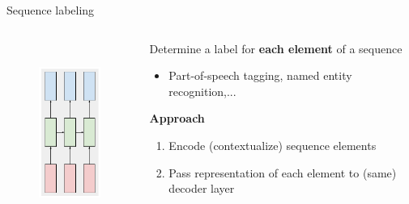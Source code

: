 \documentclass[12pt,aspectratio=169,handout]{beamer}
\begin{document}
\begin{frame}{Sequence labeling}
	\begin{columns}[T] %
		\begin{column}{.49\textwidth}
		
			\begin{figure}[h]
				\includegraphics[height=6cm]{sequence_labeling.pdf}
			\end{figure}
		
		\end{column}
		\begin{column}{.49\textwidth}
			\vspace{1cm}
			Determine a label for \textbf{each element} of a sequence
			\begin{itemize}
				\item Part-of-speech tagging, named entity recognition,...
			\end{itemize}
			\pause
			\textbf{Approach}
			\begin{enumerate}
				\item Encode (contextualize) sequence elements
				\item Pass representation of each element to (same) decoder layer
			\end{enumerate}
		\end{column}
	\end{columns}

\end{frame}
\end{document}
